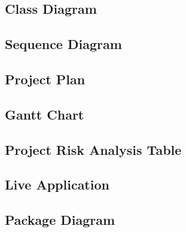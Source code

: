 \documentclass[11pt]{article}
\begin{document}
	\subsection{Class Diagram}
	\subsection{Sequence Diagram}
	\subsection{Project Plan} %
	\subsection{Gantt Chart}
	\subsection{Project Risk Analysis Table}
	\subsection{Live Application}
	\subsection{Package Diagram}
\end{document}
